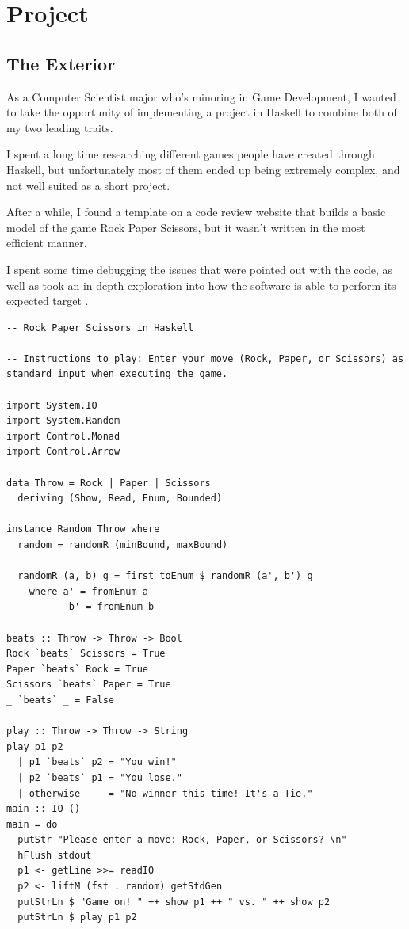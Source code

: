 \documentclass{article}
\begin{document}
\section{Project}

\hspace{\parindent} 
\subsection{The Exterior}
\medskip\medskip
\hspace{\parindent} 

As a Computer Scientist major who's minoring in Game Development, I wanted to take the opportunity of implementing a project in Haskell to combine both of my two leading traits.

\medskip\noindent
I spent a long time researching different games people have created through Haskell, but unfortunately most of them ended up being extremely complex, and not well suited as a short project.

\medskip\noindent
After a while, I found a template on a code review website that builds a basic model of the game Rock Paper Scissors, but it wasn't written in the most efficient manner.

\medskip\noindent
I spent some time debugging the issues that were pointed out with the code, as well as took an in-depth exploration into how the software is able to perform its expected target \cite{SF}.

\begin{lstlisting}
-- Rock Paper Scissors in Haskell 

-- Instructions to play: Enter your move (Rock, Paper, or Scissors) as standard input when executing the game.

import System.IO
import System.Random
import Control.Monad
import Control.Arrow

data Throw = Rock | Paper | Scissors
  deriving (Show, Read, Enum, Bounded)

instance Random Throw where
  random = randomR (minBound, maxBound)

  randomR (a, b) g = first toEnum $ randomR (a', b') g
    where a' = fromEnum a
           b' = fromEnum b

beats :: Throw -> Throw -> Bool
Rock `beats` Scissors = True
Paper `beats` Rock = True
Scissors `beats` Paper = True
_ `beats` _ = False

play :: Throw -> Throw -> String
play p1 p2
  | p1 `beats` p2 = "You win!"
  | p2 `beats` p1 = "You lose."
  | otherwise     = "No winner this time! It's a Tie."
main :: IO ()
main = do
  putStr "Please enter a move: Rock, Paper, or Scissors? \n"
  hFlush stdout
  p1 <- getLine >>= readIO
  p2 <- liftM (fst . random) getStdGen
  putStrLn $ "Game on! " ++ show p1 ++ " vs. " ++ show p2
  putStrLn $ play p1 p2
\end{lstlisting}
\end{document}

